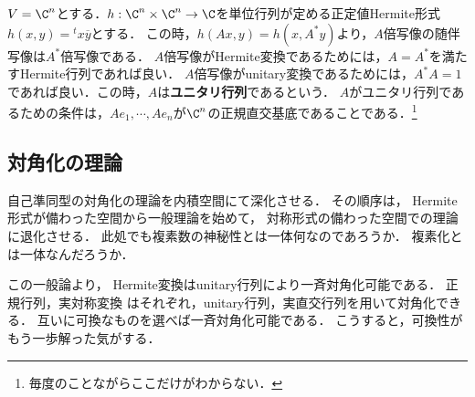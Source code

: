 \documentclass[uplatex, dvipdfmx]{jsreport}
\begin{document}
\begin{example}[標準内積]
    $V=\C^n$とする．$h:\C^n\times\C^n\to\C$を単位行列が定める正定値Hermite形式$h(x,y)={}^t\!x\overline{y}$とする．
    この時，$h(Ax,y)=h(x,A^*y)$より，$A$倍写像の随伴写像は$A^*$倍写像である．
    $A$倍写像がHermite変換であるためには，$A=A^*$を満たすHermite行列であれば良い．
    $A$倍写像がunitary変換であるためには，$A^*A=1$であれば良い．この時，$A$は\textbf{ユニタリ行列}であるという．
    $A$がユニタリ行列であるための条件は，$Ae_1,\cdots,Ae_n$が$\C^n$の正規直交基底であることである．\footnote{毎度のことながらここだけがわからない．}
\end{example}

\subsection{対角化の理論}\label{subsec-可換性と対角化}

\begin{tcolorbox}[colframe=ForestGreen, colback=ForestGreen!10!white, breakable]
    自己準同型の対角化の理論を内積空間にて深化させる．
    その順序は，
    Hermite形式が備わった空間から一般理論を始めて，
    対称形式の備わった空間での理論に退化させる．
    此処でも複素数の神秘性とは一体何なのであろうか．
    複素化とは一体なんだろうか．

    この一般論より，
    Hermite変換はunitary行列により一斉対角化可能である．
    正規行列，実対称変換
    はそれぞれ，unitary行列，実直交行列を用いて対角化できる．
    互いに可換なものを選べば一斉対角化可能である．
    こうすると，可換性がもう一歩解った気がする．
\end{tcolorbox}
\end{document}
